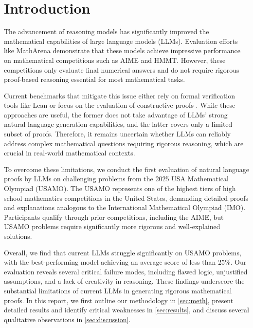 \section{Introduction}
The advancement of reasoning models has significantly improved the mathematical capabilities of large language models (LLMs). Evaluation efforts like MathArena \citep{matharena} demonstrate that these models achieve impressive performance on mathematical competitions such as AIME and HMMT. However, these competitions only evaluate final numerical answers and do not require rigorous proof-based reasoning essential for most mathematical tasks. 

Current benchmarks that mitigate this issue either rely on formal verification tools like Lean \citep{minif2f,fimo,putnambench} or focus on the evaluation of constructive proofs \citep{mathconstruct}. While these approaches are useful, the former does not take advantage of LLMs' strong natural language generation capabilities, and the latter covers only a limited subset of proofs. Therefore, it remains uncertain whether LLMs can reliably address complex mathematical questions requiring rigorous reasoning, which are crucial in real-world mathematical contexts.

To overcome these limitations, we conduct the first evaluation of natural language proofs by LLMs on challenging problems from the 2025 USA Mathematical Olympiad (USAMO). The USAMO represents one of the highest tiers of high school mathematics competitions in the United States, demanding detailed proofs and explanations analogous to the International Mathematical Olympiad (IMO). Participants qualify through prior competitions, including the AIME, but USAMO problems require significantly more rigorous and well-explained solutions.

Overall, we find that current LLMs struggle significantly on USAMO problems, with the best-performing model achieving an average score of less than $25\%$. Our evaluation reveals several critical failure modes, including flawed logic, unjustified assumptions, and a lack of creativity in reasoning. These findings underscore the substantial limitations of current LLMs in generating rigorous mathematical proofs. In this report, we first outline our methodology in \cref{sec:meth}, present detailed results and identify critical weaknesses in \cref{sec:results}, and discuss several qualitative observations in \cref{sec:discussion}.

